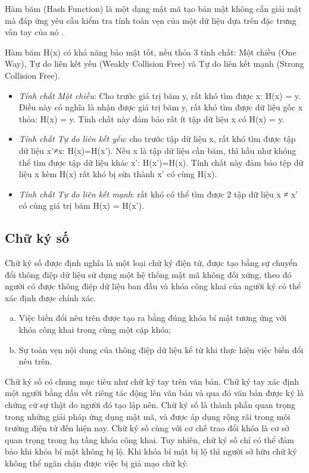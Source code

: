 Hàm băm (Hash Function) là một dạng mật mã tạo bản mật không cần giải mật mà đáp ứng yêu cầu kiểm tra tính toàn vẹn của một dữ liệu dựa trên đặc trưng vân tay của nó \cite{phạmnguyênkhang2013}.

Hàm băm H(x) có khả năng bảo mật tốt, nếu thỏa 3 tính chất: 
Một chiều (One Way),  Tự do liên kết yếu (Weakly Collision Free) và Tự do liên kết mạnh (Strong Collision Free).

\begin{itemize}
\item \emph{Tính chất Một chiều}: Cho trước giá trị băm y, rất khó tìm được x: H(x) = y. Điều này có nghĩa là nhận được giá trị băm y, rất khó tìm được dữ liệu gốc x thỏa: H(x) = y. Tính chất này đảm bảo rất ít tập dữ liệu x có H(x) = y.

\item \emph{Tính chất Tự do liên kết yếu}: cho trước tập dữ liệu x, rất khó tìm được tập dữ liệu x’≠x: H(x)=H(x’). Nếu x là tập dữ liệu cần băm, thì hầu như không thể tìm được tập dữ liệu khác x’: H(x’)=H(x). Tính chất này đảm bảo tệp dữ liệu x kèm H(x) rất khó bị sửa thành x’ có cùng H(x).

\item \emph{Tính chất Tự do liên kết mạnh}: rất khó có thể tìm được 2 tập dữ liệu x ≠ x’ có cùng giá trị băm H(x) = H(x’).
\end{itemize}

\subsection{Chữ ký số}
Chữ ký số được định nghĩa là một loại chữ ký điện tử, được tạo bằng sự chuyển đổi thông điệp dữ liệu sử dụng một hệ thống mật mã không đối xứng, theo đó người có được thông điệp dữ liệu ban đầu và khóa công khai của người ký có thể xác định được chính xác.

\begin{enumerate}[a)]
\item Việc biến đổi nêu trên được tạo ra bằng đúng khóa bí mật tương ứng với khóa công khai trong cùng một cặp khóa;
\item Sự toàn vẹn nội dung của thông điệp dữ liệu kể từ khi thực hiện việc biến đổi nêu trên.
\end{enumerate}

Chữ ký số có chung mục tiêu như chữ ký tay trên văn bản. Chữ ký tay xác định một người bằng dấu vết riêng tác động lên văn bản và qua đó văn bản được ký là chứng cứ sự thật do người đó tạo lập nên. Chữ ký số là thành phần quan trọng trong những giải pháp ứng dụng mật mã, và được áp dụng rộng rãi trong môi trường điện tử đến hiện nay. Chữ ký số cùng với cơ chế trao đổi khóa là cơ sở quan trọng trong hạ tầng khóa công khai. Tuy nhiên, chữ ký số chỉ có thể đảm bảo khi khóa bí mật không bị lộ. Khi khóa bí mật bị lộ thì người sở hữu chữ ký không thể ngăn chặn được việc bị giả mạo chữ ký.

